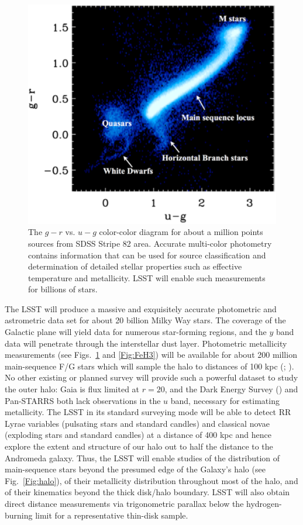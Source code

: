 \begin{figure}
\includegraphics[width=1.0\hsize,clip]{MarlaUGR.pdf}
\caption{The $g-r$ vs. $u-g$ color-color diagram for about a million points sources
from SDSS Stripe 82 area. Accurate multi-color photometry
contains information that can be used for source classification and determination of
detailed stellar properties such as effective temperature and metallicity. LSST will
enable such measurements for billions of stars.}
\label{Fig:FeH}
\end{figure}


The LSST will produce a massive and exquisitely accurate photometric and astrometric data set for about 20 billion
Milky Way stars. The coverage of the Galactic plane will yield data for numerous star-forming
regions, and the $y$ band data will penetrate through the interstellar dust layer. Photometric metallicity
measurements (see Figs.~\ref{Fig:FeH} and \ref{Fig:FeH3}) will be available for about 200 million main-sequence
F/G stars which will sample the halo to distances of 100 kpc (\cite{Ivezic2008a}; \cite{An2013}). No other
existing or planned survey will provide such a powerful dataset to
study the outer halo: Gaia
is flux limited at $r=20$, and the Dark Energy Survey (\cite{Rossetto2011}) and Pan-STARRS both
lack observations in the $u$ band, necessary for estimating metallicity. The LSST in its standard surveying mode will
be able to detect RR Lyrae variables (pulsating stars and standard candles) and classical novae (exploding stars
and standard candles) at a distance of 400 kpc and hence explore the extent and structure of our  halo out to
half the distance to the Andromeda galaxy. Thus, the LSST will enable studies of the distribution of main-sequence
stars beyond the presumed edge of the Galaxy's halo (see Fig.~\ref{Fig:halo}), of their metallicity distribution
throughout most of the halo, and of their kinematics beyond the thick disk/halo boundary. LSST will also obtain
direct distance measurements via trigonometric parallax below the hydrogen-burning limit for a representative
thin-disk sample.

